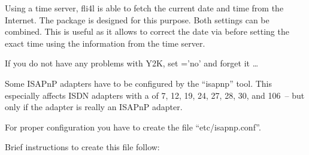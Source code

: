   Using a time server, fli4l is able to fetch the current date and time from
  the Internet. The package  is designed
  for this purpose. Both settings can be combined. This is useful as it allows
  to correct the date via  before setting the exact time using
  the information from the time server.

  If you do not have any problems with Y2K, set ='no' and
  forget it \ldots



  Some ISAPnP adapters have to be configured by the ``isapnp'' tool. This
  especially affects ISDN adapters with a  of 7, 12, 19, 24,
  27, 28, 30, and 106~-- but only if the adapter is really an ISAPnP adapter.

  For proper configuration you have to create the file
  ``etc/isapnp.conf''.

  Brief instructions to create this file follow:

